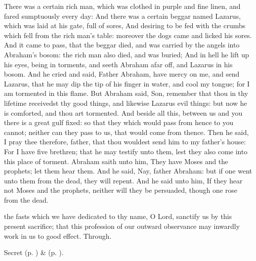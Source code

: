 
 There was a certain rich man, which was clothed in purple and fine linen, and fared sumptuously every day: And there was a certain beggar named Lazarus, which was laid at his gate, full of sores, And desiring to be fed with the crumbs which fell from the rich man's table: moreover the dogs came and licked his sores. And it came to pass, that the beggar died, and was carried by the angels into Abraham's bosom: the rich man also died, and was buried; And in hell he lift up his eyes, being in torments, and seeth Abraham afar off, and Lazarus in his bosom. And he cried and said, Father Abraham, have mercy on me, and send Lazarus, that he may dip the tip of his finger in water, and cool my tongue; for I am tormented in this flame. But Abraham said, Son, remember that thou in thy lifetime receivedst thy good things, and likewise Lazarus evil things: but now he is comforted, and thou art tormented. And beside all this, between us and you there is a great gulf fixed: so that they which would pass from hence to you cannot; neither can they pass to us, that would come from thence. Then he said, I pray thee therefore, father, that thou wouldest send him to my father's house: For I have five brethren; that he may testify unto them, lest they also come into this place of torment. Abraham saith unto him, They have Moses and the prophets; let them hear them. And he said, Nay, father Abraham: but if one went unto them from the dead, they will repent. And he said unto him, If they hear not Moses and the prophets, neither will they be persuaded, though one rose from the dead.


\secret
{} the fasts which we have dedicated to thy name, O Lord, sanctify us by this present sacrifice; that this profession of our outward observance may inwardly work in us to good effect. Through.
\begin{rubric}
     Secret  (p. \pageref{AshWednesdayMassSecret}) \&   (p. \pageref{SPLivingDeparted}).
\end{rubric}

